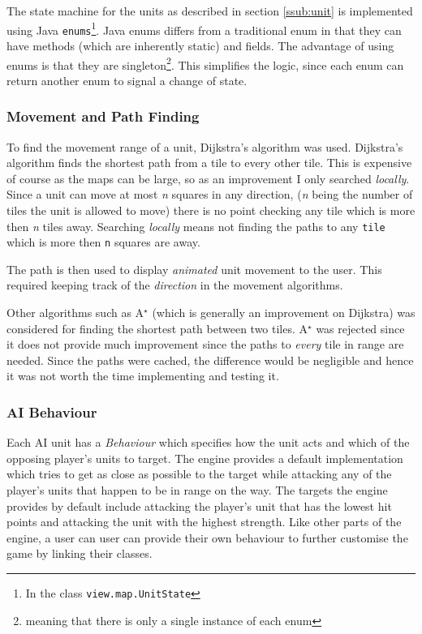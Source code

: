 The state machine for the units as described in section \ref{ssub:unit} is implemented using Java \texttt{enums}\footnote{In the class \texttt{view.map.UnitState}}. Java enums differs from a traditional enum in that they can have methods (which are inherently static) and fields.  The advantage of using enums is that they are singleton\footnote{meaning that there is only a single instance of each enum}.  This simplifies the logic, since each enum can return another enum to signal a change of state.

\subsubsection{Movement and Path Finding}

To find the movement range of a unit, Dijkstra's algorithm was used. Dijkstra's algorithm finds the shortest path from a tile to every other tile. This is expensive of course as the maps can be large, so as an improvement I only searched \emph{locally}. Since a unit can move at most \emph{n} squares in any direction, (\emph{n} being the number of tiles the unit is allowed to move) there is no point checking any tile which is more then \emph{n} tiles away.  Searching \emph{locally} means not finding the paths to any \texttt{tile} which is more then \texttt{n} squares are away.

The path is then used to display \emph{animated} unit movement to the user.  This required keeping track of the \emph{direction} in the movement algorithms. 

\def\astar{A$^{\star}$ }

Other algorithms such as \astar (which is generally an improvement on Dijkstra) was considered for finding the shortest path between two tiles. \astar was rejected since it does not provide much improvement since the paths to \emph{every} tile in range are needed. Since the paths were cached, the difference would be negligible and hence it was not worth the time implementing and testing it.

\subsubsection{AI Behaviour}
Each AI unit has a \emph{Behaviour} which specifies how the unit acts and which of the opposing player's units to target.  The engine provides a default implementation which tries to get as close as possible to the target while attacking any of the player's units that happen to be in range on the way.  The targets the engine provides by default include attacking the player's unit that has the lowest hit points and attacking the unit with the highest strength. Like other parts of the engine, a user can user can provide their own behaviour to further customise the game by linking their classes.

